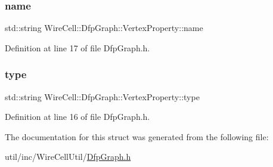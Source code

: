 \subsubsection{\texorpdfstring{name}{name}}
{\footnotesize\ttfamily std\+::string Wire\+Cell\+::\+Dfp\+Graph\+::\+Vertex\+Property\+::name}



Definition at line 17 of file Dfp\+Graph.\+h.

\mbox{\label{struct_wire_cell_1_1_dfp_graph_1_1_vertex_property_a603229260abe259637bf0f4e82c6b4a0}} 
\subsubsection{\texorpdfstring{type}{type}}
{\footnotesize\ttfamily std\+::string Wire\+Cell\+::\+Dfp\+Graph\+::\+Vertex\+Property\+::type}



Definition at line 16 of file Dfp\+Graph.\+h.



The documentation for this struct was generated from the following file\+:\begin{DoxyCompactItemize}
\item 
util/inc/\+Wire\+Cell\+Util/\hyperlink{_dfp_graph_8h}{Dfp\+Graph.\+h}\end{DoxyCompactItemize}
